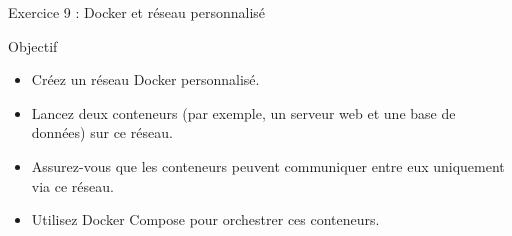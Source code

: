 \documentclass{beamer}
\begin{document}
\begin{frame}{Exercice 9 : Docker et réseau personnalisé}
\begin{block}{Objectif}
\begin{itemize}
  \item Créez un réseau Docker personnalisé.
  \item Lancez deux conteneurs (par exemple, un serveur web et une base de données) sur ce réseau.
  \item Assurez-vous que les conteneurs peuvent communiquer entre eux uniquement via ce réseau.
  \item Utilisez Docker Compose pour orchestrer ces conteneurs.
\end{itemize}
\end{block}
\end{frame}


\end{document}
